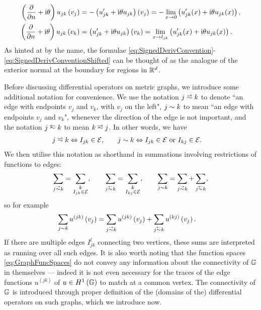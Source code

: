 \begin{subequations} \label{eq:SignedDerivConventionShifted}
	\begin{align*}
		\left( \dfrac{\partial }{\partial n}+ \mathrm{i}\theta \right)u_{jk}\left( v_j \right) &= -\left( u_{jk}' + \mathrm{i}\theta u_{jk} \right)\left( v_j \right) = -\lim_{x\rightarrow0} \left(  u_{jk}'(x)+\mathrm{i}\theta u_{jk}(x)  \right), \\
		\left( \dfrac{\partial }{\partial n}+ \mathrm{i}\theta \right)u_{jk}\left( v_k \right) &= \left( u_{jk}' + \mathrm{i}\theta u_{jk} \right)\left( v_k \right) = \lim_{x\rightarrow l_{jk}} \left(  u_{jk}'(x)+\mathrm{i}\theta u_{jk}(x)  \right).
	\end{align*}
\end{subequations}
As hinted at by the name, the formulae \eqref{eq:SignedDerivConvention}-\eqref{eq:SignedDerivConventionShifted} can be thought of as the analogue of the exterior normal at the boundary for regions in $\mathbb{R}^d$.

Before discussing differential operators on metric graphs, we introduce some additional notation for convenience.
We use the notation $j\conLeft k$ to denote ``an edge with endpoints $v_j$ and $v_k$, with $v_j$ on the left", $j\sim k$ to mean ``an edge with endpoints $v_j$ and $v_k$", whenever the direction of the edge is not important, and the notation $j \conRight k$ to mean $k\conLeft j$.
In other words, we have
\begin{align*}
	j\conLeft k \Leftrightarrow I_{jk}\in \edgeSet, &\qquad
	j\con k \Leftrightarrow I_{jk}\in \edgeSet \text{ or } I_{kj}\in \edgeSet.
\end{align*}
We then utilise this notation as shorthand in summations involving restrictions of functions to edges:
\begin{align*}
	\sum_{j\conLeft k} = \sum_{\substack{k \\ I_{jk}\in \edgeSet}}, 
	\qquad 	\sum_{j\conRight k} = \sum_{\substack{k \\ I_{kj}\in \edgeSet}},
	\qquad \sum_{j\con k} = \sum_{j\conLeft k} + \sum_{j\conRight k},
\end{align*}
so for example
\begin{align*}
	\sum_{j\con k}u^{(jk)}\bracs{v_j} &= \sum_{j\conLeft k}u^{(jk)}\bracs{v_j} + \sum_{j\conRight k}u^{(kj)}\bracs{v_j}.
\end{align*}
If there are multiple edges $I_{jk}^l$ connecting two vertices, these sums are interpreted as running over all such edges.
It is also worth noting that the function spaces \eqref{eq:GraphFuncSpaces} do not convey any information about the connectivity of $\mathbb{G}$ in themselves --- indeed it is not even necessary for the traces of the edge functions $u^{(jk)}$ of $u\in H^1\left( \mathbb{G} \right)$ to match at a common vertex. 
The connectivity of $\mathbb{G}$ is introduced through proper definition of the (domains of the) differential operators on such graphs, which we introduce now.

